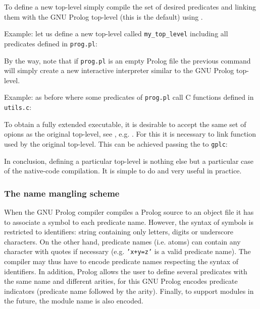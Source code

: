 To define a new top-level simply compile the set of desired predicates and
linking them with the GNU Prolog top-level (this is the default) using
 .

Example: let us define a new top-level called \texttt{my\_top\_level}
including all predicates defined in \texttt{prog.pl}:


By the way, note that if \texttt{prog.pl} is an empty Prolog file the
previous command will simply create a new interactive interpreter similar to
the GNU Prolog top-level.

Example: as before where some predicates of \texttt{prog.pl} call C functions
defined in \texttt{utils.c}:


To obtain a fully extended executable, it is desirable to accept the same set of
opions as the original top-level, see
, e.g. . For
this it is necessary to link  function used by the original
top-level. This can be achieved passing the  to
\texttt{gplc}:


In conclusion, defining a particular top-level is nothing else but a
particular case of the native-code compilation. It is simple to do and very
useful in practice.

\subsubsection{The name mangling scheme}
\label{Name-mangling-scheme}

When the GNU Prolog compiler compiles a Prolog source to an object file it
has to associate a symbol to each predicate name. However, the syntax of
symbols is restricted to identifiers: string containing only letters, digits
or underscore characters. On the other hand, predicate names (i.e. atoms) can
contain any character with quotes if necessary (e.g. \texttt{'x+y=z'} is a
valid predicate name). The compiler may thus have to encode predicate names
respecting the syntax of identifiers. In addition, Prolog allows the user to
define several predicates with the same name and different arities, for this
GNU Prolog encodes predicate indicators (predicate name followed by the
arity). Finally, to support modules in the future, the module name is also
encoded.

